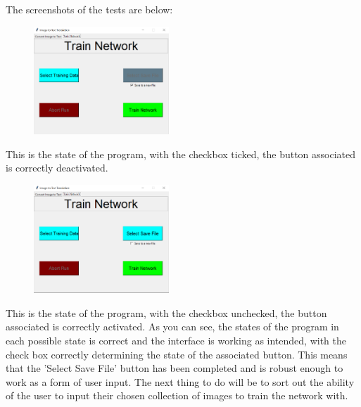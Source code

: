 \documentclass{report}
\begin{document}
\newline
The screenshots of the tests are below:
\begin{figure}[H]
    \centering
    \includegraphics[width=2in]{Images/Development and Testing/Stage 8/Select Save File Button Tests/With Check box checked.png}
\end{figure}
\noindent This is the state of the program, with the checkbox ticked, the button associated is correctly deactivated.
\begin{figure}[H]
    \centering
    \includegraphics[width=2in]{Images/Development and Testing/Stage 8/Select Save File Button Tests/Without Check box checked.png}
\end{figure}
\noindent This is the state of the program, with the checkbox unchecked, the button associated is correctly activated.
\newline
\newline 
As you can see, the states of the program in each possible state is correct and the interface is working as intended, with the check box correctly determining the state of the associated button. This means that the 'Select Save File' button has been completed and is robust enough to work as a form of user input. The next thing to do will be to sort out the ability of the user to input their chosen collection of images to train the network with.
\end{document}
